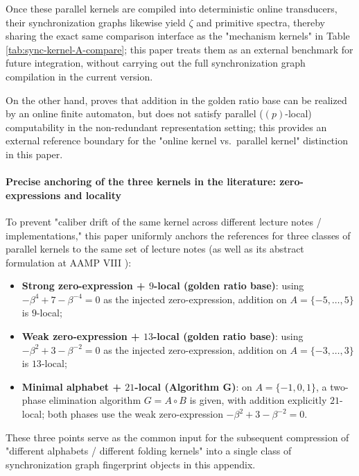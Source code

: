 Once these parallel kernels are compiled into deterministic online transducers, their synchronization graphs likewise yield $\zeta$ and primitive spectra, thereby sharing the exact same comparison interface as the "mechanism kernels" in Table \ref{tab:sync-kernel-A-compare}; this paper treats them as an external benchmark for future integration, without carrying out the full synchronization graph compilation in the current version.
\par
On the other hand, \cite{Frougny1999OnlineAddition} proves that addition in the golden ratio base can be realized by an online finite automaton, but does not satisfy parallel ($(p)$-local) computability in the non-redundant representation setting; this provides an external reference boundary for the "online kernel vs.\ parallel kernel" distinction in this paper.

\paragraph{Precise anchoring of the three kernels in the literature: zero-expressions and locality}
To prevent "caliber drift of the same kernel across different lecture notes / implementations," this paper uniformly anchors the references for three classes of parallel kernels to the same set of lecture notes \cite{FrougnyHellerPelantovaSvobodovaParallelAlgorithmsSlides} (as well as its abstract formulation at AAMP VIII \cite{SvobodovaAAMPVIIIParallelAddition}):
\begin{itemize}
  \item \textbf{Strong zero-expression + $9$-local (golden ratio base)}: using $-\beta^4+7-\beta^{-4}=0$ as the injected zero-expression, addition on $A=\{-5,\dots,5\}$ is $9$-local;
  \item \textbf{Weak zero-expression + $13$-local (golden ratio base)}: using $-\beta^2+3-\beta^{-2}=0$ as the injected zero-expression, addition on $A=\{-3,\dots,3\}$ is $13$-local;
  \item \textbf{Minimal alphabet + $21$-local (Algorithm G)}: on $A=\{-1,0,1\}$, a two-phase elimination algorithm $G=A\circ B$ is given, with addition explicitly $21$-local; both phases use the weak zero-expression $-\beta^2+3-\beta^{-2}=0$.
\end{itemize}
These three points serve as the common input for the subsequent compression of "different alphabets / different folding kernels" into a single class of synchronization graph fingerprint objects in this appendix.


